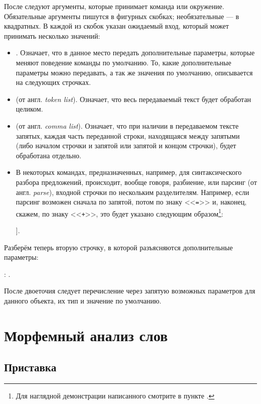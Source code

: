 После следуют аргументы, которые принимает команда или окружение. Обязательные аргументы пишутся в фигурных скобках; необязательные --- в квадратных. В каждой из скобок указан ожидаемый вход, который может принимать несколько значений:
\begin{itemize}
    \item \rsOptionsAux. Означает, что в данное место передать дополнительные параметры, которые меняют поведение команды по умолчанию. То, какие дополнительные параметры можно передавать, а так же значения по умолчанию, описывается на следующих строчках.
    \item \rsArgAux[tl]\space (от англ. \textit{token list}). Означает, что весь передаваемый текст будет обработан целиком.
    \item \rsArgAux\space (от англ. \textit{comma list}). Означает, что при наличии в передаваемом тексте запятых, каждая часть переданной строки, находящаяся между запятыми (либо началом строчки и запятой или запятой и концом строчки), будет обработана отдельно.
    \item В некоторых командах, предназначенных, например, для синтаксического разбора предложений, происходит, вообще говоря, разбиение, или парсинг (от англ. \textit{parse}), входной строчки по нескольким разделителям. Например, если парсинг возможен сначала по запятой, потом по знаку <<\texttt{=}>> и, наконец, скажем, по знаку <<\texttt{+}>>, это будет указано следующим образом\footnote{Для наглядной демонстрации написанного смотрите в пункте .}:
    \begin{center}
        \rsArgAux[clist][[=, +]].
    \end{center}
\end{itemize}


Разберём теперь вторую строчку, в которой разъясняются дополнительные параметры:
\begin{center}
    \rsOptionsAux: . 
\end{center}

После двоеточия следует перечисление через запятую возможных параметров для данного объекта, их тип и значение по умолчанию.



\section{Морфемный анализ слов} 

\subsection{Приставка}

